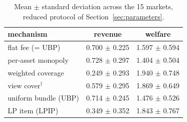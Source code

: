 \begin{table}[t]
  \centering
  \small
  \caption{Mean $\pm$ standard deviation across the 15 \sqlshare{} markets, reduced protocol of Section~\ref{sec:parameters}.}
  \label{tab:markets}
  \begin{tabular}{@{}lcc@{}}
    \toprule
    mechanism & revenue & welfare \\
    \midrule
    flat fee (= UBP) & 0.700 $\pm$ 0.225 & 1.597 $\pm$ 0.594 \\
    per-asset monopoly & 0.728 $\pm$ 0.297 & 1.404 $\pm$ 0.504 \\
    \qirana{} weighted coverage & 0.249 $\pm$ 0.293 & 1.940 $\pm$ 0.748 \\
    \querymarket{} view cover$^{\dagger}$ & 0.579 $\pm$ 0.295 & 1.869 $\pm$ 0.649 \\
    uniform bundle (UBP) & 0.714 $\pm$ 0.245 & 1.476 $\pm$ 0.526 \\
    LP item (LPIP) & 0.349 $\pm$ 0.352 & 1.843 $\pm$ 0.767 \\
    \bottomrule
  \end{tabular}
\end{table}
